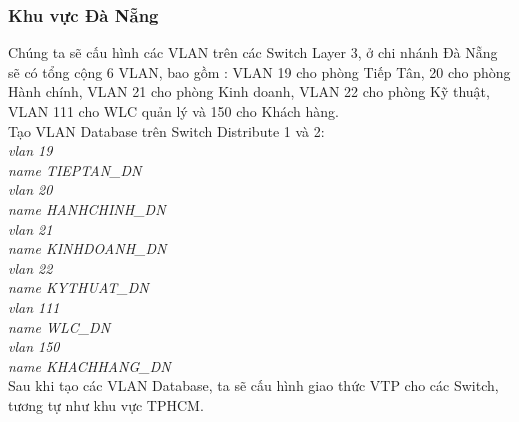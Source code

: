 \documentclass[12pt,a4paper]{report}
\begin{document}
\subsubsection{Khu vực Đà Nẵng}
\hspace*{1cm}Chúng ta sẽ cấu hình các VLAN trên các Switch Layer 3, ở chi nhánh Đà Nẵng sẽ có tổng cộng 6 VLAN, bao gồm : VLAN 19 cho phòng Tiếp Tân, 20 cho phòng Hành chính, VLAN 21 cho phòng Kinh doanh, VLAN 22 cho phòng Kỹ thuật, VLAN 111 cho WLC quản lý và 150 cho Khách hàng.\\
\hspace*{1cm}Tạo VLAN Database trên Switch Distribute 1 và 2:\\
\hspace*{2cm}\textit{vlan 19\\
\hspace*{2cm}name TIEPTAN\_DN \\
\hspace*{2cm}vlan 20\\
\hspace*{2cm}name HANHCHINH\_DN\\
\hspace*{2cm}vlan 21\\
\hspace*{2cm}name KINHDOANH\_DN\\
\hspace*{2cm}vlan 22\\
\hspace*{2cm}name KYTHUAT\_DN \\
\hspace*{2cm}vlan 111\\
\hspace*{2cm}name WLC\_DN \\
\hspace*{2cm}vlan 150\\
\hspace*{2cm}name KHACHHANG\_DN\\}
\hspace*{1cm}Sau khi tạo các VLAN Database, ta sẽ cấu hình giao thức VTP cho các Switch, tương tự như khu vực TPHCM.
\end{document}
